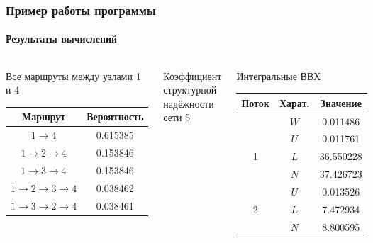 \documentclass[aspectratio=43]{beamer}
\begin{document}
\begin{frame}
\frametitle{Пример работы программы}
\framesubtitle{Результаты вычислений}

\begin{columns}[t]
\begin{block}{Все маршруты между узлами 1 и 4}
\begin{tabular}{|c|c|}
\hline Маршрут & Вероятность \\
\hline \( 1 \rightarrow 4 \) & 0.615385 \\
\hline \( 1 \rightarrow 2 \rightarrow 4 \) & 0.153846\\
\hline \( 1 \rightarrow 3 \rightarrow 4 \) & 0.153846\\
\hline \( 1 \rightarrow 2 \rightarrow 3 \rightarrow 4 \) & 0.038462 \\
\hline \( 1 \rightarrow 3 \rightarrow 2 \rightarrow 4 \) & 0.038461 \\
\hline
\end{tabular}
\end{block}

\begin{block}{Коэффициент структурной надёжности сети}
5
\end{block}

\begin{block}{Интегральные ВВХ}
\begin{tabular}{|c|c|c|}
\hline Поток & Харат. & Значение \\
\hline \cellcolor{black}		& \( W \) & 0.011486 \\

\hline \multirow{3}{*}{1} 	& \( U \) & 0.011761 \\
\hhline{~--} 				& \( L \) & 36.550228 \\
\hhline{~--} 				& \( N \) & 37.426723 \\

\hline \multirow{3}{*}{2} 	& \( U \) & 0.013526 \\
\hhline{~--} 				& \( L \) & 7.472934 \\
\hhline{~--} 				& \( N \) & 8.800595 \\
\hline
\end{tabular}
\end{block}
\end{columns}
\end{frame}
\end{document}
